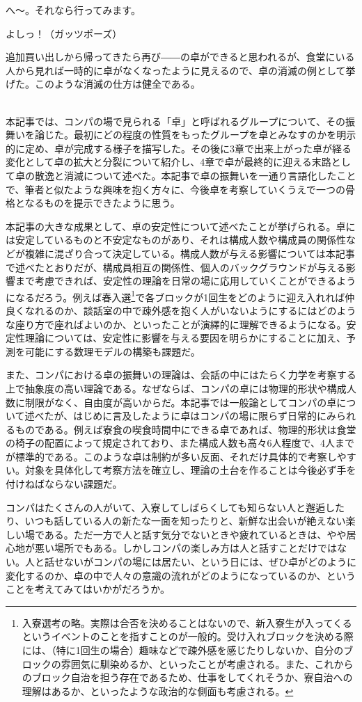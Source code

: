 \begin{multicols}{2}
へ～。それなら行ってみます。

よしっ！（ガッツポーズ）

追加買い出しから帰ってきたら再び――の卓ができると思われるが、食堂にいる人から見れば一時的に卓がなくなったように見えるので、卓の消滅の例として挙げた。このような消滅の仕方は健全である。
\par
\dotfill

\\
本記事では、コンパの場で見られる「卓」と呼ばれるグループについて、その振舞いを論じた。最初にどの程度の性質をもったグループを卓とみなすのかを明示的に定め、卓が完成する様子を描写した。その後に3章で出来上がった卓が経る変化として卓の拡大と分裂について紹介し、4章で卓が最終的に迎える末路として卓の散逸と消滅について述べた。本記事で卓の振舞いを一通り言語化したことで、筆者と似たような興味を抱く方々に、今後卓を考察していくうえで一つの骨格となるものを提示できたように思う。
\par
本記事の大きな成果として、卓の安定性について述べたことが挙げられる。卓には安定しているものと不安定なものがあり、それは構成人数や構成員の関係性などが複雑に混ざり合って決定している。構成人数が与える影響については本記事で述べたとおりだが、構成員相互の関係性、個人のバックグラウンドが与える影響まで考慮できれば、安定性の理論を日常の場に応用していくことができるようになるだろう。例えば春入選\footnote{入寮選考の略。実際は合否を決めることはないので、新入寮生が入ってくるというイベントのことを指すことのが一般的。受け入れブロックを決める際には、（特に1回生の場合）趣味などで疎外感を感じたりしないか、自分のブロックの雰囲気に馴染めるか、といったことが考慮される。また、これからのブロック自治を担う存在であるため、仕事をしてくれそうか、寮自治への理解はあるか、といったような政治的な側面も考慮される。}で各ブロックが1回生をどのように迎え入れれば仲良くなれるのか、談話室の中で疎外感を抱く人がいないようにするにはどのような座り方で座ればよいのか、といったことが演繹的に理解できるようになる。安定性理論については、安定性に影響を与える要因を明らかにすることに加え、予測を可能にする数理モデルの構築も課題だ。
\par
また、コンパにおける卓の振舞いの理論は、会話の中にはたらく力学を考察する上で抽象度の高い理論である。なぜならば、コンパの卓には物理的形状や構成人数に制限がなく、自由度が高いからだ。本記事では一般論としてコンパの卓について述べたが、はじめに言及したように卓はコンパの場に限らず日常的にみられるものである。例えば寮食の喫食時間中にできる卓であれば、物理的形状は食堂の椅子の配置によって規定されており、また構成人数も高々6人程度で、4人までが標準的である。このような卓は制約が多い反面、それだけ具体的で考察しやすい。対象を具体化して考察方法を確立し、理論の土台を作ることは今後必ず手を付けねばならない課題だ。
\par
  コンパはたくさんの人がいて、入寮してしばらくしても知らない人と邂逅したり、いつも話している人の新たな一面を知ったりと、新鮮な出会いが絶えない楽しい場である。ただ一方で人と話す気分でないときや疲れているときは、やや居心地が悪い場所でもある。しかしコンパの楽しみ方は人と話すことだけではない。人と話せないがコンパの場には居たい、という日には、ぜひ卓がどのように変化するのか、卓の中で人々の意識の流れがどのようになっているのか、ということを考えてみてはいかがだろうか。
\end{multicols}
